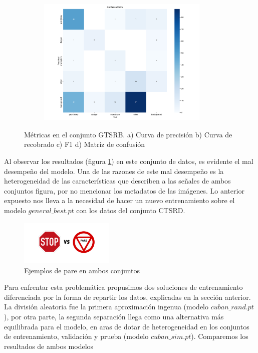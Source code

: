 \documentclass{article}
\begin{document}
\begin{figure}[h]
\begin{subfigure}[b]{0.5\textwidth}
\caption{}
\end{subfigure}
\begin{subfigure}[b]{0.5\textwidth}
\centering
\includegraphics[width=0.9\textwidth]{resources/cuban in general confusion matrix.png}
\caption{}
\end{subfigure}
\caption{Métricas en el conjunto GTSRB. a) Curva de precisión b) Curva de recobrado c) F1 d) Matriz de confusión}
\label{fig:results in cuban general}
\end{figure}

Al observar los resultados (figura \ref{fig:results in cuban general}) en este conjunto de datos, es evidente el mal desempeño del modelo. Una de las razones de este mal desempeño es la heterogeneidad de las características que describen a las señales de ambos conjuntos figura, por no mencionar los metadatos de las imágenes. Lo anterior expuesto nos lleva a la necesidad de hacer un nuevo entrenamiento sobre el modelo $general\_best.pt$ con los datos del conjunto CTSRD.

\begin{figure}[h]
\centering
\includegraphics[width=0.4\textwidth]{resources/vs.png}
\caption{Ejemplos de pare en ambos conjuntos}
\label{fig:vs}
\end{figure}

Para enfrentar esta problemática propusimos dos soluciones de entrenamiento diferenciada por la forma de repartir los datos, explicadas en la sección anterior. La división aleatoria fue la primera aproximación ingenua (modelo $cuban\_rand.pt$), por otra parte, la segunda separación llega como una alternativa más equilibrada para el modelo, en aras de dotar de heterogeneidad en los conjuntos de entrenamiento, validación y prueba (modelo $cuban\_sim.pt$). Comparemos los resultados de ambos modelos
\end{document}

